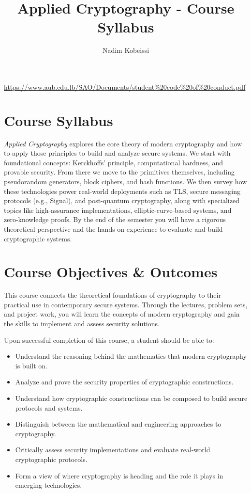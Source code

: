 \documentclass[10pt,a4paper,american]{exam}
\title{Applied Cryptography - Course Syllabus}
\author{Nadim Kobeissi}
\begin{document}
\classhandoutheader
\urldef{\urlcodeofconduct}\url{https://www.aub.edu.lb/SAO/Documents/student%20code%20of%20conduct.pdf}
\section*{Course Syllabus}

\textit{Applied Cryptography} explores the core theory of modern cryptography and how to apply those principles to build and analyze secure systems. We start with foundational concepts: Kerckhoffs' principle, computational hardness, and provable security. From there we move to the primitives themselves, including pseudorandom generators, block ciphers, and hash functions. We then survey how these technologies power real-world deployments such as TLS, secure messaging protocols (e.g., Signal), and post-quantum cryptography, along with specialized topics like high-assurance implementations, elliptic-curve-based systems, and zero-knowledge proofs. By the end of the semester you will have a rigorous theoretical perspective and the hands-on experience to evaluate and build cryptographic systems.

\section{Course Objectives \& Outcomes}
This course connects the theoretical foundations of cryptography to their practical use in contemporary secure systems. Through the lectures, problem sets, and project work, you will learn the concepts of modern cryptography and gain the skills to implement and assess security solutions.

Upon successful completion of this course, a student should be able to:

\begin{itemize}
	\item Understand the reasoning behind the mathematics that modern cryptography is built on.
	\item Analyze and prove the security properties of cryptographic constructions.
	\item Understand how cryptographic constructions can be composed to build secure protocols and systems.
	\item Distinguish between the mathematical and engineering approaches to cryptography.
	\item Critically assess security implementations and evaluate real-world cryptographic protocols.
	\item Form a view of where cryptography is heading and the role it plays in emerging technologies.
\end{itemize}
\end{document}
